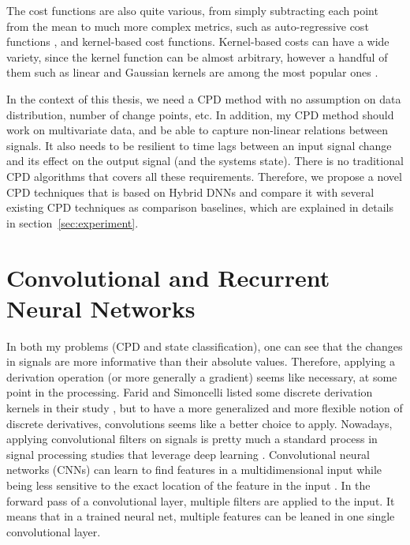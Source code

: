 The cost functions are also quite various, from simply subtracting each point from the mean to much more complex metrics, such as auto-regressive cost functions \cite{angelosante2012group}, and kernel-based cost functions. Kernel-based costs can have a wide variety, since the kernel function can be almost arbitrary, however a handful of them such as linear and Gaussian kernels are among the most popular ones \cite{Truong2018ChangePointSurvey}.

In the context of this thesis, we need a CPD method with no assumption on data distribution, number of change points, etc. In addition, my CPD method should work on multivariate data, and be able to capture non-linear relations between signals. It also needs to be resilient to time lags between an input signal change and its effect on the output signal (and the systems state). There is no traditional CPD algorithms that covers all these requirements.
Therefore, we propose a novel CPD techniques that is based on Hybrid DNNs and compare it with several existing CPD techniques as comparison baselines, which are explained in details in section~\ref{sec:experiment}.   


\section{Convolutional and Recurrent Neural Networks}
In both my problems (CPD and state classification), one can see that the changes in signals are more informative than their absolute values. Therefore, applying a derivation operation (or more generally a gradient) seems like necessary, at some point in the processing. Farid and Simoncelli listed some discrete derivation kernels in their study \cite{Farid2004}, but to have a more generalized and more flexible notion of discrete derivatives, convolutions seems like a better choice to apply. 
Nowadays, applying convolutional filters on signals is pretty much a standard process in signal processing studies that leverage deep learning \cite{morales2016deep, zeng2014convolutional, yang2015deep}. Convolutional neural networks (CNNs) can learn to find features in a multidimensional input while being less sensitive to the exact location of the feature in the input \cite{lecun2015deep}. In the forward pass of a convolutional layer, multiple filters are applied to the input. %
It means that in a trained neural net, multiple features can be leaned in one single convolutional layer.

